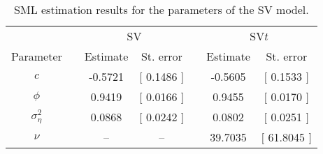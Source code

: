 \small{  
{ \renewcommand{\arraystretch}{1.3} 
\begin{longtable}{cc cc c cc } 
\caption{SML estimation results for the parameters of the SV model.} 
\label{tab:sml} \\ 
  & &  \multicolumn{2}{c}{SV} & &  \multicolumn{2}{c}{SV$t$} \\ \cline{1-1} \cline{3-4} \cline{6-7}   
 Parameter & &  Estimate & St. error &&  Estimate & St. error\\ \cline{1-1} \cline{3-4} \cline{6-7}   
$c$ & &-0.5721 &  $[$ 0.1486 $]$ && -0.5605 &  $[$ 0.1533 $]$  \\ 
$\phi$ & &0.9419 &  $[$ 0.0166 $]$ && 0.9455 &  $[$ 0.0170 $]$  \\ 
$\sigma^{2}_{\eta}$ & &0.0868 &  $[$ 0.0242 $]$ && 0.0802 &  $[$ 0.0251 $]$  \\ 
$\nu$ & &-- & -- && 39.7035 &  $[$ 61.8045 $]$  \\ 
\hline 
\end{longtable} 
} 
} 
\normalsize 
